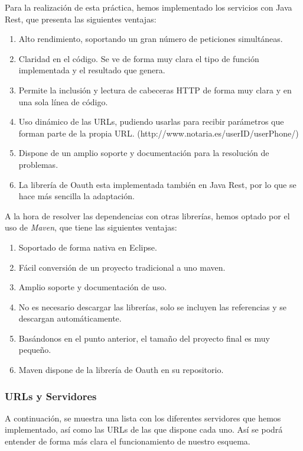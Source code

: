 \documentclass[a4,12pt,onecolum]{article}
\begin{document}
Para la realización de esta práctica, hemos implementado los servicios con Java Rest, que presenta las siguientes ventajas:
\begin{enumerate}
\item Alto rendimiento, soportando un gran número de peticiones simultáneas.
\item Claridad en el código. Se ve de forma muy clara el tipo de función implementada y el resultado que genera.
\item Permite la inclusión y lectura de cabeceras HTTP de forma muy clara y en una sola línea de código.
\item Uso dinámico de las URLs, pudiendo usarlas para recibir parámetros que forman parte de la propia URL. (http://www.notaria.es/{userID}/{userPhone}/)
\item Dispone de un amplio soporte y documentación para la resolución de problemas.
\item La librería de Oauth esta implementada también en Java Rest, por lo que se hace más sencilla la adaptación. \\
\end{enumerate}

A la hora de resolver las dependencias con otras librerías, hemos optado por el uso de \emph{Maven}, que tiene las siguientes ventajas:
\begin{enumerate}
\item Soportado de forma nativa en Eclipse.
\item Fácil conversión de un proyecto tradicional a uno maven.
\item Amplio soporte y documentación de uso.
\item No es necesario descargar las librerías, solo se incluyen las referencias y se descargan automáticamente.
\item Basándonos en el punto anterior, el tamaño del proyecto final es muy pequeño.
\item Maven dispone de la librería de Oauth en su repositorio.
\end{enumerate}


\subsubsection{URLs y Servidores}
A continuación, se muestra una lista con los diferentes servidores que hemos implementado, así como las URLs de las que dispone cada uno. Así se podrá entender de forma más clara el funcionamiento de nuestro esquema.
\end{document}
